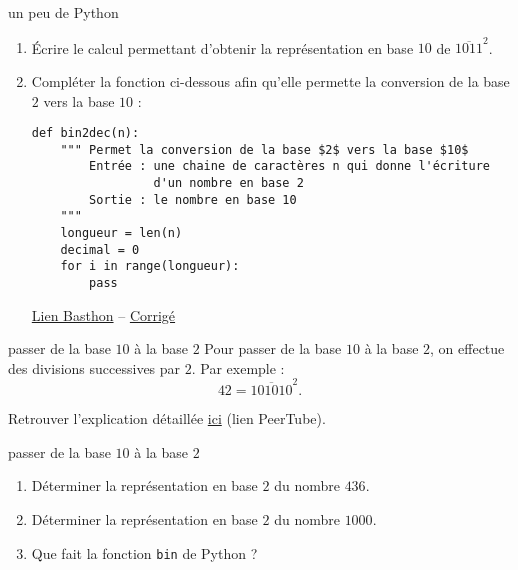 \documentclass[a4paper,dvipsnames]{article}
\newcommand{\basthon}[1]{{\href{https://notebook.basthon.fr/?from=#1}{Lien Basthon}}}
\newcommand{\basthonC}[1]{{\href{https://notebook.basthon.fr/?from=#1}{Corrigé}}}
\begin{document}
\begin{exercice}{un peu de Python}{}
  \begin{enumerate}
    \item Écrire le calcul permettant d'obtenir la représentation en base $10$ de $\overline{1011}^2$.
    \item Compléter la fonction ci-dessous afin qu'elle permette la conversion de la base $2$ vers la base $10$ : 
\begin{verbatim}
def bin2dec(n):
    """ Permet la conversion de la base $2$ vers la base $10$
        Entrée : une chaine de caractères n qui donne l'écriture 
                 d'un nombre en base 2
        Sortie : le nombre en base 10
    """
    longueur = len(n)
    decimal = 0
    for i in range(longueur):
        pass
\end{verbatim}       
\basthon{https://raw.githubusercontent.com/dcaisson/Notebooks-Jupyter-NSI/main/Th\%C3\%A8me\%201\%20-\%20Repr\%C3\%A9sentation\%20des\%20donn\%C3\%A9es\%20\%3A\%20types\%20et\%20valeurs\%20de\%20base/Repr\%C3\%A9sentation\%20des\%20entiers/bin2dec.ipynb} -- 
\basthonC{https://raw.githubusercontent.com/dcaisson/Notebooks-Jupyter-NSI/main/Th\%C3\%A8me\%201\%20-\%20Repr\%C3\%A9sentation\%20des\%20donn\%C3\%A9es\%20\%3A\%20types\%20et\%20valeurs\%20de\%20base/Repr\%C3\%A9sentation\%20des\%20entiers/bin2dec_C.ipynb}
  \end{enumerate}
\end{exercice}

\smallskip

\begin{methode}{passer de la base $10$ à la base $2$}{}
  Pour passer de la base $10$ à la base $2$, on effectue des divisions successives par $2$. Par exemple :
  \[42=\overline{101010}^2.\]

  Retrouver l'explication détaillée \href{https://peertube-lyclpg.ddns.net:9443/videos/watch/4c93481e-da2d-4cdd-b274-9ed67ce998f5}{ici} (lien PeerTube).
\end{methode}

\smallskip

\begin{exercice}{passer de la base $10$ à la base $2$}{}
  \begin{enumerate}
    \item Déterminer la représentation en base $2$ du nombre $436$.
    \item Déterminer la représentation en base $2$ du nombre $1000$.
    \item Que fait la fonction \texttt{bin} de Python ?
  \end{enumerate}
\end{exercice}
\end{document}

